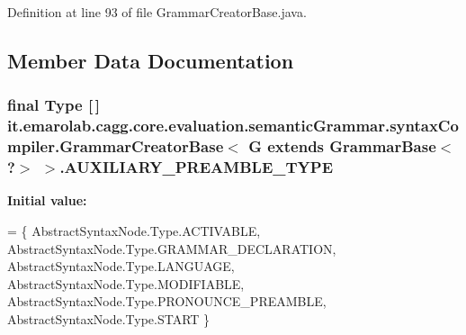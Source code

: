 Definition at line 93 of file Grammar\-Creator\-Base.\-java.



\subsection{Member Data Documentation}
\hypertarget{classit_1_1emarolab_1_1cagg_1_1core_1_1evaluation_1_1semanticGrammar_1_1syntaxCompiler_1_1Gramma1bf252c3f4def91ad707660fdfe73d0a_acd6cccf1ea941b23f8c93d5cb8e70522}{
\subsubsection[{A\-U\-X\-I\-L\-I\-A\-R\-Y\-\_\-\-P\-R\-E\-A\-M\-B\-L\-E\-\_\-\-T\-Y\-P\-E}]{\setlength{\rightskip}{0pt plus 5cm}final Type \mbox{[}$\,$\mbox{]} it.\-emarolab.\-cagg.\-core.\-evaluation.\-semantic\-Grammar.\-syntax\-Compiler.\-Grammar\-Creator\-Base$<$ G extends Grammar\-Base$<$ ?$>$ $>$.A\-U\-X\-I\-L\-I\-A\-R\-Y\-\_\-\-P\-R\-E\-A\-M\-B\-L\-E\-\_\-\-T\-Y\-P\-E\hspace{0.3cm}{\ttfamily [static]}}}\label{classit_1_1emarolab_1_1cagg_1_1core_1_1evaluation_1_1semanticGrammar_1_1syntaxCompiler_1_1Gramma1bf252c3f4def91ad707660fdfe73d0a_acd6cccf1ea941b23f8c93d5cb8e70522}
{\bfseries Initial value\-:}
\begin{DoxyCode}
= \{ 
        AbstractSyntaxNode.Type.ACTIVABLE, 
        AbstractSyntaxNode.Type.GRAMMAR\_DECLARATION, 
        AbstractSyntaxNode.Type.LANGUAGE, 
        AbstractSyntaxNode.Type.MODIFIABLE, 
        AbstractSyntaxNode.Type.PRONOUNCE\_PREAMBLE, 
        AbstractSyntaxNode.Type.START
    \}
\end{DoxyCode}


